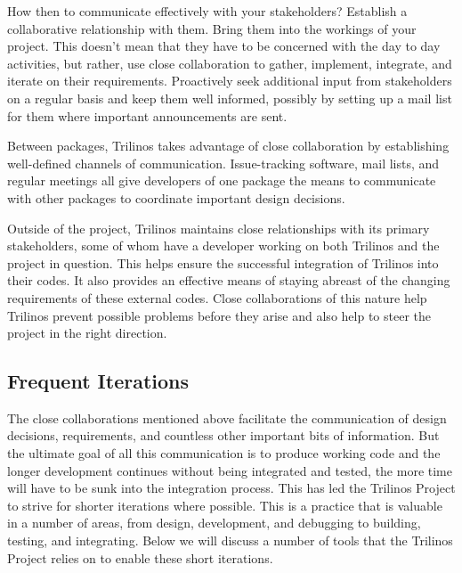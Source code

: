 \documentclass[12pt,relax]{article}
\begin{document}
How then to communicate effectively with your stakeholders?  Establish a
collaborative relationship with them.  Bring them into the workings of your
project.  This doesn't mean that they have to be concerned with the day to day
activities, but rather, use close collaboration to gather, implement,
integrate, and iterate on their requirements.  Proactively seek additional
input from stakeholders on a regular basis and keep them well informed, 
possibly by setting up a mail list for them where important announcements
are sent.

Between packages, Trilinos takes advantage of close collaboration by 
establishing well-defined channels of communication.  Issue-tracking
software, mail lists, and regular meetings all give developers of one package
the means to communicate with other packages to coordinate important design
decisions.

Outside of the project, Trilinos maintains close relationships with its primary
stakeholders, some of whom have a developer working on both Trilinos and the
project in question.  This helps ensure the successful integration of Trilinos
into their codes.  It also provides an effective means of staying abreast of
the changing requirements of these external codes.  Close collaborations of
this nature help Trilinos prevent possible problems before they arise and also
help to steer the project in the right direction.

\subsection{Frequent Iterations}

The close collaborations mentioned above facilitate the communication of 
design decisions, requirements, and countless other important bits of
information.  But the ultimate goal of all this communication is to produce
working code and the longer development continues without being integrated and
tested, the more time will have to be sunk into the integration process.  This
has led the Trilinos Project to strive for shorter iterations where possible.
This is a practice that is valuable in a number of areas, from design,
development, and debugging to building, testing, and integrating.  Below we
will discuss a number of tools that the Trilinos Project relies on to enable
these short iterations.
\end{document}

